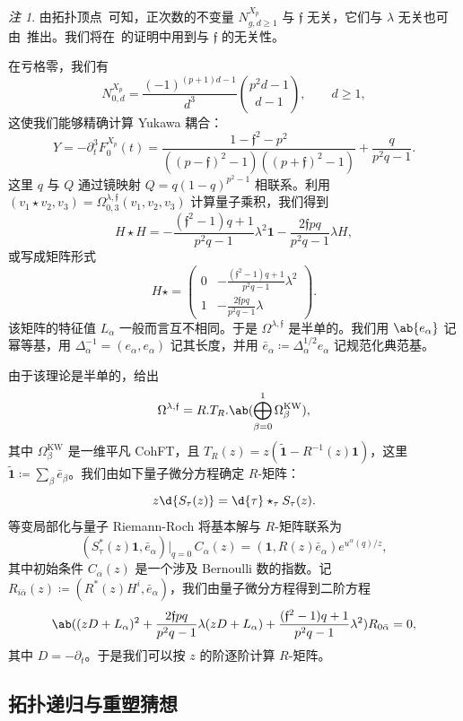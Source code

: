 \documentclass{amsart}
\theoremstyle{definition}
\theoremstyle{remark}
\newtheorem{rmk}[thm]{注}
\theoremstyle{plain}
\theoremstyle{definition}
\theoremstyle{remark}
\newcommand{\mf}[1]{\mathfrak{#1}}
\newcommand{\mr}[1]{\mathrm{#1}}
\newcommand{\wt}[1]{\widetilde{#1}}
\newcommand{\1}{\mathbf{1}}
\newcommand{\2}{\mathbf{2}}
\newcommand{\3}{\mathbf{3}}
\begin{document}
\begin{rmk}
    由拓扑顶点~\cite{LLLZ2009}可知，正次数的不变量 \(N^{X_p}_{g,d\geq1}\) 与 \(\mf{f}\) 无关，它们与 \(\lambda\) 无关也可由~推出。我们将在~的证明中用到与 \(\mf{f}\) 的无关性。
\end{rmk}

在亏格零，我们有
\[ N^{X_p}_{0,d} = \frac{(-1)^{(p+1)d-1}}{d^3}\binom{p^2d-1}{d-1}, \qquad d \geq 1, \]
这使我们能够精确计算 Yukawa 耦合：
\[ Y = -\partial_t^3 F_0^{X_p}(t) = \frac{1-\mf{f}^2-p^2}{((p-\mf{f})^2-1)((p+\mf{f})^2-1)} + \frac{q}{p^2q-1}. \]
这里 \(q\) 与 \(Q\) 通过镜映射 \(Q = q(1-q)^{p^2-1}\) 相联系。利用 \((v_1 \star v_2, v_3) = \Omega^{\lambda,\mf{f}}_{0,3}(v_1,v_2,v_3)\) 计算量子乘积，我们得到
\[ H \star H = -\frac{(\mf{f}^2-1)q+1}{p^2q-1}\lambda^2 \1 - \frac{2\mf{f}pq}{p^2q-1}\lambda H, \]
或写成矩阵形式
\[ H \star = \begin{pmatrix} 0 & -\frac{(\mf{f}^2-1)q+1}{p^2q-1}\lambda^2 \\ 1 & -\frac{2\mf{f}pq}{p^2q-1}\lambda \end{pmatrix}. \]
该矩阵的特征值 \(L_{\alpha}\) 一般而言互不相同。于是 \(\Omega^{\lambda,\mf{f}}\) 是半单的。我们用 \(\ab\{e_{\alpha}\}\) 记幂等基，用 \(\Delta_{\alpha}^{-1} = (e_{\alpha},e_{\alpha})\) 记其长度，并用 \(\bar{e}_{\alpha} \coloneqq \Delta_{\alpha}^{1/2}e_{\alpha}\) 记规范化典范基。

由于该理论是半单的，给出
\[ \Omega^{\lambda,\mf{f}} = R.T_R.\ab(\bigoplus_{\beta=0}^1 \Omega^{\mr{KW}}_{\beta}), \]
其中 \(\Omega^{\mr{KW}}_{\beta}\) 是一维平凡 CohFT，且 \(T_R(z) = z(\wt{\1}-R^{-1}(z)\1)\)，这里 \(\wt{\1} \coloneqq \sum_{\beta}\bar{e}_{\beta}\)。我们由如下量子微分方程确定 \(R\)-矩阵：
\[ z \d{S_{\tau}(z)} = \d{\tau} \star_{\tau} S_{\tau}(z). \]
等变局部化与量子 Riemann-Roch 将基本解与 \(R\)-矩阵联系为
\[ (S^*_{\tau}(z)\1, \bar{e}_{\alpha})\big|_{q=0}\, C_{\alpha}(z) = (\1, R(z)\bar{e}_{\alpha})e^{u^{\alpha}(q)/z}, \]
其中初始条件 \(C_{\alpha}(z)\) 是一个涉及 Bernoulli 数的指数。记 \(R_{i\bar{\alpha}}(z) \coloneqq (R^*(z)H^i, \bar{e}_{\alpha})\)，我们由量子微分方程得到二阶方程
\[ \ab( (zD+L_{\alpha})^2 + \frac{2\mf{f}pq}{p^2q-1}\lambda(zD+L_{\alpha}) + \frac{(\mf{f}^2-1)q+1}{p^2q-1}\lambda^2 )R_{0\bar{\alpha}} = 0, \]
其中 \(D = -\partial_t\)。于是我们可以按 \(z\) 的阶逐阶计算 \(R\)-矩阵。

\subsection{拓扑递归与重塑猜想}%
\label{sub:Topological recursion and the remodeling conjecture}
\end{document}
